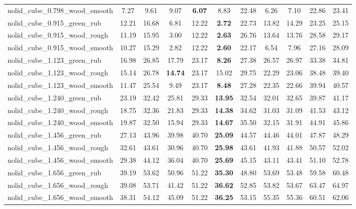 \begin{table}[H]
{\begin{tabular}{l cccccccccc}
        nolid\_cube\_0.798\_wood\_smooth & 7.27 & 9.61 & 9.07 & \textbf{6.07} & 8.83 & 22.48 & 6.26 & 7.10 & 22.86 & 23.41 \\
        nolid\_cube\_0.915\_green\_rub & 12.21 & 16.68 & 6.81 & 12.22 & \textbf{2.72} & 22.73 & 13.82 & 14.29 & 23.25 & 25.15 \\
        nolid\_cube\_0.915\_wood\_rough & 11.19 & 15.95 & 3.00 & 12.22 & \textbf{2.63} & 26.76 & 13.64 & 13.76 & 28.58 & 29.17 \\
        nolid\_cube\_0.915\_wood\_smooth & 10.27 & 15.29 & 2.82 & 12.22 & \textbf{2.60} & 22.17 & 6.54 & 7.96 & 27.16 & 28.09 \\
        nolid\_cube\_1.123\_green\_rub & 16.98 & 26.85 & 17.79 & 23.17 & \textbf{8.26} & 27.38 & 26.57 & 26.97 & 33.38 & 34.81 \\
        nolid\_cube\_1.123\_wood\_rough & 15.14 & 26.78 & \textbf{14.74} & 23.17 & 15.02 & 29.75 & 22.29 & 23.06 & 38.48 & 39.40 \\
        nolid\_cube\_1.123\_wood\_smooth & 11.47 & 25.54 & 9.49 & 23.17 & \textbf{8.48} & 27.28 & 22.35 & 22.66 & 39.94 & 40.57 \\
        nolid\_cube\_1.240\_green\_rub & 23.19 & 32.42 & 25.81 & 29.33 & \textbf{13.95} & 32.54 & 32.01 & 32.65 & 39.87 & 41.17 \\
        nolid\_cube\_1.240\_wood\_rough & 18.75 & 32.36 & 21.83 & 29.33 & \textbf{14.38} & 34.62 & 31.03 & 31.09 & 41.53 & 43.12 \\
        nolid\_cube\_1.240\_wood\_smooth & 19.87 & 32.50 & 15.94 & 29.33 & \textbf{14.67} & 35.50 & 32.15 & 31.91 & 44.91 & 45.86 \\
        nolid\_cube\_1.456\_green\_rub & 27.13 & 43.96 & 39.98 & 40.70 & \textbf{25.09} & 44.57 & 44.46 & 44.01 & 47.87 & 48.29 \\
        nolid\_cube\_1.456\_wood\_rough & 32.61 & 43.61 & 30.96 & 40.70 & \textbf{25.98} & 43.61 & 41.93 & 41.88 & 50.57 & 52.02 \\
        nolid\_cube\_1.456\_wood\_smooth & 29.38 & 44.12 & 36.04 & 40.70 & \textbf{25.69} & 45.15 & 43.11 & 43.41 & 51.10 & 52.78 \\
        nolid\_cube\_1.656\_green\_rub & 39.19 & 53.62 & 50.96 & 51.22 & \textbf{35.30} & 48.80 & 53.69 & 53.48 & 59.58 & 60.48 \\
        nolid\_cube\_1.656\_wood\_rough & 39.08 & 53.71 & 41.42 & 51.22 & \textbf{36.62} & 52.85 & 53.82 & 53.67 & 63.47 & 64.97 \\
        nolid\_cube\_1.656\_wood\_smooth & 38.31 & 54.12 & 45.09 & 51.22 & \textbf{36.25} & 53.15 & 55.35 & 55.36 & 60.51 & 62.06 \\

\end{tabular}}
\end{table}
